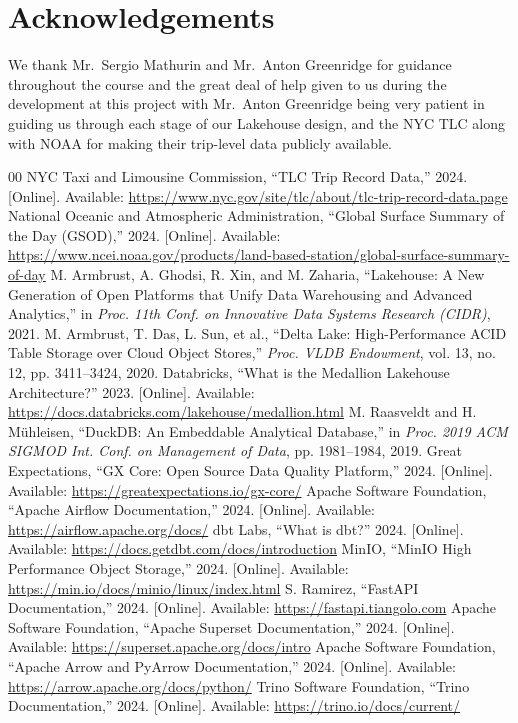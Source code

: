 \documentclass[conference]{IEEEtran}
\begin{document}
\section*{Acknowledgements}
We thank Mr.\ Sergio Mathurin and Mr.\ Anton Greenridge for guidance throughout the course and the great deal of help given to us during the development at this project with Mr.\ Anton Greenridge being very patient in guiding us through each stage of our Lakehouse design, and the NYC TLC along with NOAA for making their trip-level data publicly available.

\begin{thebibliography}{00}
 NYC Taxi and Limousine Commission, ``TLC Trip Record Data,'' 2024. [Online]. Available: \url{https://www.nyc.gov/site/tlc/about/tlc-trip-record-data.page}
 National Oceanic and Atmospheric Administration, ``Global Surface Summary of the Day (GSOD),'' 2024. [Online]. Available: \url{https://www.ncei.noaa.gov/products/land-based-station/global-surface-summary-of-day}
 M. Armbrust, A. Ghodsi, R. Xin, and M. Zaharia, ``Lakehouse: A New Generation of Open Platforms that Unify Data Warehousing and Advanced Analytics,'' in \textit{Proc. 11th Conf. on Innovative Data Systems Research (CIDR)}, 2021.
 M. Armbrust, T. Das, L. Sun, et al., ``Delta Lake: High-Performance ACID Table Storage over Cloud Object Stores,'' \textit{Proc. VLDB Endowment}, vol. 13, no. 12, pp. 3411--3424, 2020.
 Databricks, ``What is the Medallion Lakehouse Architecture?'' 2023. [Online]. Available: \url{https://docs.databricks.com/lakehouse/medallion.html}
 M. Raasveldt and H. M\"{u}hleisen, ``DuckDB: An Embeddable Analytical Database,'' in \textit{Proc. 2019 ACM SIGMOD Int. Conf. on Management of Data}, pp. 1981--1984, 2019.
 Great Expectations, ``GX Core: Open Source Data Quality Platform,'' 2024. [Online]. Available: \url{https://greatexpectations.io/gx-core/}
 Apache Software Foundation, ``Apache Airflow Documentation,'' 2024. [Online]. Available: \url{https://airflow.apache.org/docs/}
 dbt Labs, ``What is dbt?'' 2024. [Online]. Available: \url{https://docs.getdbt.com/docs/introduction}
 MinIO, ``MinIO High Performance Object Storage,'' 2024. [Online]. Available: \url{https://min.io/docs/minio/linux/index.html}
 S. Ramirez, ``FastAPI Documentation,'' 2024. [Online]. Available: \url{https://fastapi.tiangolo.com}
 Apache Software Foundation, ``Apache Superset Documentation,'' 2024. [Online]. Available: \url{https://superset.apache.org/docs/intro}
 Apache Software Foundation, ``Apache Arrow and PyArrow Documentation,'' 2024. [Online]. Available: \url{https://arrow.apache.org/docs/python/}
 Trino Software Foundation, ``Trino Documentation,'' 2024. [Online]. Available: \url{https://trino.io/docs/current/}
\end{thebibliography}
\end{document}
